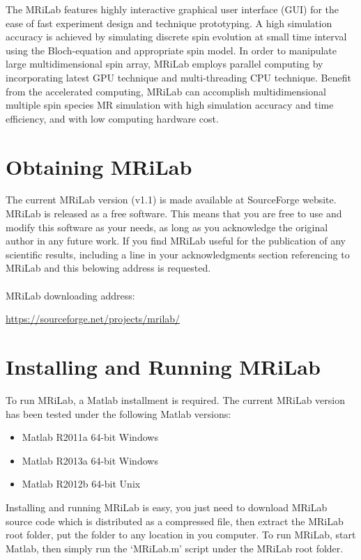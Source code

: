 \documentclass{book}%
\begin{document}
The MRiLab features highly interactive graphical user interface (GUI) for the ease of fast experiment design and technique prototyping. A high simulation accuracy is achieved by simulating discrete spin evolution at small time interval using the Bloch-equation and appropriate spin model. In order to manipulate large multidimensional spin array, MRiLab employs parallel computing by incorporating latest GPU technique and multi-threading CPU technique. Benefit from the accelerated computing, MRiLab can accomplish multidimensional multiple spin species MR simulation with high simulation accuracy and time efficiency, and with low computing hardware cost. 

\section{Obtaining MRiLab}
The current MRiLab version (v1.1) is made available at SourceForge website. MRiLab is released as a free software. This means that you are free to use and modify this software as your needs, as long as you acknowledge the original author in any future work. If you find MRiLab useful for the publication of any scientific results, including a line in your acknowledgments section referencing to MRiLab and this belowing address is requested.\\
\\
MRiLab downloading address:
\begin{center}
\url{https://sourceforge.net/projects/mrilab/}
\end{center}

\section{Installing and Running MRiLab}

To run MRiLab, a Matlab installment is required. The current MRiLab version has been tested under the following Matlab versions:
\begin{itemize}
\item Matlab R2011a 64-bit Windows
\item Matlab R2013a 64-bit Windows
\item Matlab R2012b 64-bit Unix
\end{itemize}

Installing and running MRiLab is easy, you just need to download MRiLab source code which is distributed as a compressed file, then extract the MRiLab root folder, put the folder to any location in you computer. To run MRiLab, start Matlab, then simply run the `MRiLab.m' script under the MRiLab root folder. \\
\end{document}
